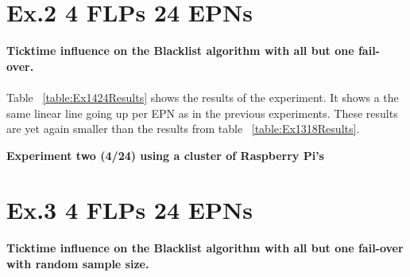 \section{Ex.2 4 FLPs 24 EPNs}
\textbf{Ticktime influence on the Blacklist algorithm with all but one fail-over.}
\\~\\
Table ~\ref{table:Ex1424Results} shows the results of the experiment. It shows a the same linear line going up per EPN as in the previous experiments. These results are yet again smaller than the results from table ~\ref{table:Ex1318Results}.

\begin{table}[h!]
\caption*{\textbf{Experiment two (4/24) using a cluster of Raspberry Pi's}}
\caption{Cumulative lost TFs by ticktime/EPN ratio with a flat sample size for the Blacklist algorithm}
\label{table:Ex2424Results}
\end{table}

\section{Ex.3 4 FLPs 24 EPNs}
\textbf{Ticktime influence on the Blacklist algorithm with all but one fail-over with random sample size.}
\\~\\

